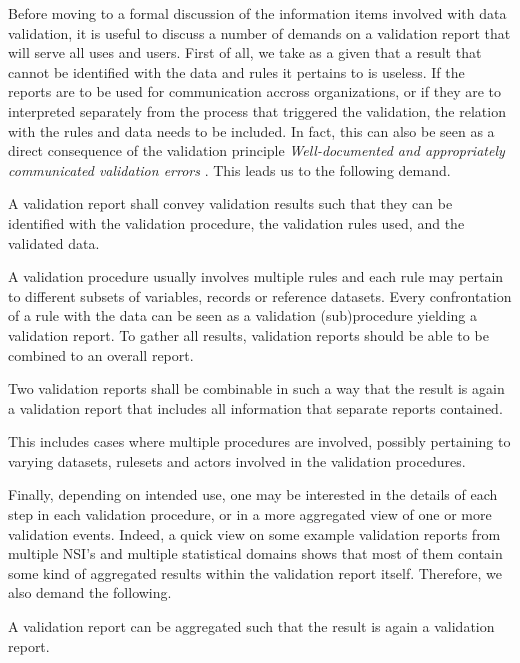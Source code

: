 Before moving to a formal discussion of the information items involved with
data validation, it is useful to discuss a number of demands on a validation
report that will serve all uses and users. First of all, we take as a given
that a result that cannot be identified with the data and rules it pertains to
is useless. If the reports are to be used for communication accross
organizations, or if they are to interpreted separately from the process that
triggered the validation, the relation with the rules and data needs to be
included.  In fact, this can also be seen as a direct consequence of the
validation principle \emph{Well-documented and appropriately communicated
validation errors} \citep{ess2017}. This leads us to the following demand.

\begin{demand}[Identification]
A validation report shall convey validation results such that they can be
identified with the validation procedure, the validation rules used, and the
validated data.
\label{dem:identify}
\end{demand}


A validation procedure usually involves multiple rules and each rule may
pertain to different subsets of variables, records or reference datasets. Every
confrontation of a rule with the data can be seen as a validation
(sub)procedure yielding a validation report. To gather all results, validation
reports should be able to be combined to an overall report.
%
\begin{demand}
Two validation reports shall be combinable in such a way that the result is
again a validation report that includes all information that separate reports
contained.
\label{dem:combine}
\end{demand}
%
This includes cases where multiple procedures are involved, possibly pertaining
to varying datasets, rulesets and actors involved in the validation procedures. 

Finally, depending on intended use, one may be interested in the details of
each step in each validation procedure, or in a more aggregated view of one or
more validation events. Indeed, a quick view on some example validation reports
from multiple NSI's and multiple statistical domains shows that most of them
contain some kind of aggregated results within the validation report itself.
Therefore, we also demand the following.

\begin{demand}
A validation report can be aggregated such that the result is again a
validation report.
\label{dem:aggregate}
\end{demand}


